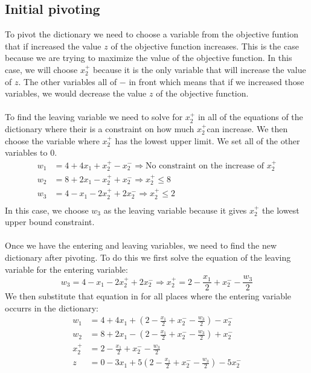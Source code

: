 \documentclass[12pt]{article}
\begin{document}
\subsection*{Initial pivoting}
To pivot the dictionary we need to choose a variable from the objective funtion that if increased the value $z$ of the objective function increases.  This is the case because we are trying to maximize the value of the objective function.  In this case, we will choose $x^{+}_{2}$ because it is the only variable that will increase the value of $z$.  The other variables all of $-$ in front which means that if we increased those variables, we would decrease the value $z$ of the objective function.\\
\\
To find the leaving variable we need to solve for $x^{+}_{2}$ in all of the equations of the dictionary where their is a constraint on how much $x^{+}_{2}$can increase.  We then choose the variable where $x^{+}_{2}$ has the lowest upper limit.  We set all of the other variables to 0.
\begin{align*}
  w_{1} &= 4 + 4x_{1} + x^{+}_{2} - x^{-}_{2} \Rightarrow \text{No constraint on the increase of } x^{+}_{2} \\
  w_{2} &= 8 + 2x_{1} - x^{+}_{2} + x^{-}_{2} \Rightarrow x^{+}_{2} \leq 8\\
  w_{3} &= 4 - x_{1} - 2x^{+}_{2} + 2x^{-}_{2} \Rightarrow x^{+}_{2} \leq 2\\
\end{align*}
In this case, we choose $w_{3}$ as the leaving variable because it gives $x^{+}_{2}$ the lowest upper bound constraint.\\
\\
Once we have the entering and leaving variables, we need to find the new dictionary after pivoting.  To do this we first solve the equation of the leaving variable for the entering variable:
$$
  w_{3} = 4 - x_{1} - 2x^{+}_{2} + 2x^{-}_{2} \Rightarrow 
  x^{+}_{2} = 2 - \frac{x_{1}}{2} + x^{-}_{2} - \frac{w_{3}}{2}
$$
We then substitute that equation in for all places where the entering variable occurrs in the dictionary:
\begin{align*}
  w_{1} &= 4 + 4x_{1} + (2 - \frac{x_{1}}{2} + x^{-}_{2} - \frac{w_{3}}{2}) - x^{-}_{2}\\
  w_{2} &= 8 + 2x_{1} - (2 - \frac{x_{1}}{2} + x^{-}_{2} - \frac{w_{3}}{2}) + x^{-}_{2}\\
  x^{+}_{2} &= 2 - \frac{x_{1}}{2} + x^{-}_{2} - \frac{w_{3}}{2}\\
  z &= 0 - 3x_{1} + 5(2 - \frac{x_{1}}{2} + x^{-}_{2} - \frac{w_{3}}{2}) - 5x^{-}_{2}
\end{align*}
\end{document}

